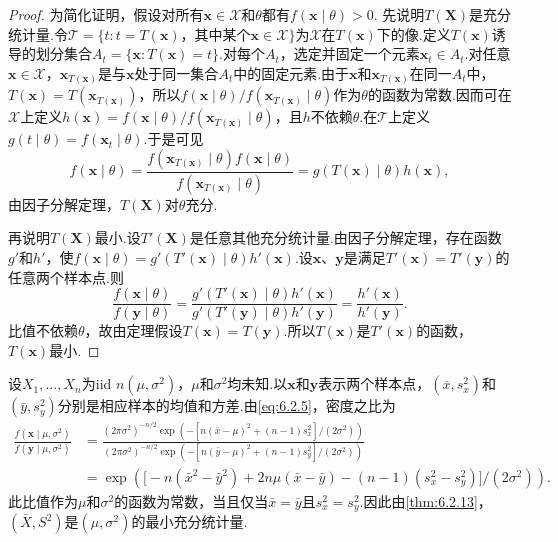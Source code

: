 \begin{proof}
为简化证明，假设对所有$\boldsymbol x\in\mathcal X$和$\theta$都有$f(\boldsymbol x\mid\theta)>0$.
先说明$T(\boldsymbol X)$是充分统计量.令$\mathcal T=\{t:t=T(\boldsymbol x)\text{，其中某个}\boldsymbol x\in\mathcal X\}$为$\mathcal X$在$T(\boldsymbol x)$下的像.定义$T(\boldsymbol x)$诱导的划分集合$A_t=\{\boldsymbol x:T(\boldsymbol x)=t\}$.对每个$A_t$，选定并固定一个元素$\boldsymbol x_t\in A_t$.对任意$\boldsymbol x\in\mathcal X$，$\boldsymbol x_{T(\boldsymbol x)}$是与$\boldsymbol x$处于同一集合$A_t$中的固定元素.由于$\boldsymbol x$和$\boldsymbol x_{T(\boldsymbol x)}$在同一$A_t$中，$T(\boldsymbol x)=T(\boldsymbol x_{T(\boldsymbol x)})$，所以$f(\boldsymbol x\mid\theta)/f(\boldsymbol x_{T(\boldsymbol x)}\mid\theta)$作为$\theta$的函数为常数.因而可在$\mathcal X$上定义$h(\boldsymbol x)=f(\boldsymbol x\mid\theta)/f(\boldsymbol x_{T(\boldsymbol x)}\mid\theta)$，且$h$不依赖$\theta$.在$\mathcal T$上定义$g(t\mid\theta)=f(\boldsymbol x_t\mid\theta)$.于是可见
$$f(\boldsymbol x\mid\theta)=\frac{f(\boldsymbol x_{T(\boldsymbol x)}\mid\theta)f(\boldsymbol x\mid\theta)}{f(\boldsymbol x_{T(\boldsymbol x)}\mid\theta)}=g(T(\boldsymbol x)\mid\theta)h(\boldsymbol x),$$
由因子分解定理，$T(\boldsymbol X)$对$\theta$充分.

再说明$T(\boldsymbol X)$最小.设$T'(\boldsymbol X)$是任意其他充分统计量.由因子分解定理，存在函数$g'$和$h'$，使$f(\boldsymbol x\mid\theta)=g'(T'(\boldsymbol x)\mid\theta)h'(\boldsymbol x)$.设$\boldsymbol x$、$\boldsymbol y$是满足$T'(\boldsymbol x)=T'(\boldsymbol y)$的任意两个样本点.则
$$\frac{f(\boldsymbol x\mid\theta)}{f(\boldsymbol y\mid\theta)}=\frac{g'(T'(\boldsymbol x)\mid\theta)h'(\boldsymbol x)}{g'(T'(\boldsymbol y)\mid\theta)h'(\boldsymbol y)}=\frac{h'(\boldsymbol x)}{h'(\boldsymbol y)}.$$
比值不依赖$\theta$，故由定理假设$T(\boldsymbol x)=T(\boldsymbol y)$.所以$T(\boldsymbol x)$是$T'(\boldsymbol x)$的函数，$T(\boldsymbol x)$最小.
\end{proof}
\begin{example}[正态分布的最小充分统计量]\label{ex:6.2.14}
设$X_1,\ldots,X_n$为iid $n(\mu,\sigma^2)$，$\mu$和$\sigma^2$均未知.以$\boldsymbol x$和$\boldsymbol y$表示两个样本点，$(\bar x,s_x^2)$和$(\bar y,s_y^2)$分别是相应样本的均值和方差.由\eqref{eq:6.2.5}，密度之比为
\begin{align*}
\frac{f(\boldsymbol x\mid\mu,\sigma^2)}{f(\boldsymbol y\mid\mu,\sigma^2)}
&=\frac{(2\pi\sigma^2)^{-n/2}\exp\left(-[n(\bar x-\mu)^2+(n-1)s_x^2]/(2\sigma^2)\right)}{(2\pi\sigma^2)^{-n/2}\exp\left(-[n(\bar y-\mu)^2+(n-1)s_y^2]/(2\sigma^2)\right)}\\
&=\exp\left(\bigl[-n(\bar x^2-\bar y^2)+2n\mu(\bar x-\bar y)-(n-1)(s_x^2-s_y^2)\bigr]/(2\sigma^2)\right).
\end{align*}
此比值作为$\mu$和$\sigma^2$的函数为常数，当且仅当$\bar x=\bar y$且$s_x^2=s_y^2$.因此由\autoref{thm:6.2.13}，$(\bar X,S^2)$是$(\mu,\sigma^2)$的最小充分统计量.
\end{example}
